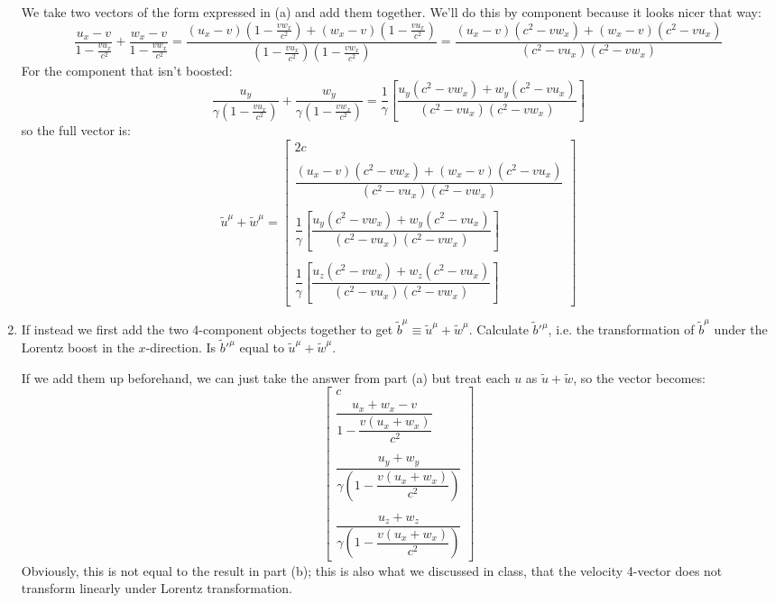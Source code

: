 \documentclass[10pt]{article}
\begin{document}
\begin{enumerate}[label=(\alph*)]
			\begin{solution}
				We take two vectors of the form expressed in (a) and add them together. We'll do this by
				component because it looks nicer that way:
				\[
					\frac{u_x - v}{1 - \frac{v u_x}{c^2}} + \frac{w_x - v}{1 - \frac{v w_x}{c^2}} =
					\frac{(u_x - v) \left( 1 - \frac{v w_x}{c^2} \right) + (w_x - v) \left( 1 - \frac{v
					u_x}{c^2} \right)}{\left( 1 - \frac{v u_x}{c^2} \right)\left( 1 - \frac{v w_x}{c^2}
			\right)} = \frac{(u_x - v)(c^2 - v w_x) + (w_x - v)(c^2 - v u_x)}{(c^2 - v u_x)(c^2 - vw_x)}
				\]
				For the component that isn't boosted:
				\[
					\frac{u_y}{\gamma\left( 1 - \frac{v u_x}{c^2} \right)} + \frac{w_y}{\gamma\left( 1 -
					\frac{v w_x}{c^2} \right)} = \frac{1}{\gamma}\left[ \frac{u_y(c^2 - vw_x) + w_y (c^2 -
			vu_x)}{(c^2 - vu_x)(c^2 - vw_x)}\right]
				\]
				so the full vector is:
				\[
					\tilde u^{\mu} + \tilde w^{\mu} = \begin{bmatrix} 2c\\ 
						\\
					\dfrac{(u_x - v)(c^2 - v w_x) + (w_x - v)(c^2 - v u_x)}{(c^2 - v u_x)(c^2 - vw_x)}\\
					\\
					\dfrac{1}{\gamma}\left[ \dfrac{u_y(c^2 - vw_x) + w_y (c^2 -
					vu_x)}{(c^2 - vu_x)(c^2 - vw_x)}\right]\\
					\\
					\dfrac{1}{\gamma}\left[ \dfrac{u_z(c^2 - vw_x) + w_z (c^2 -
					vu_x)}{(c^2 - vu_x)(c^2 - vw_x)}\right]
					\end{bmatrix}
				\]
			\end{solution}
		\item If instead we first add the two 4-component objects together to get \( \tilde b^{\mu} \equiv
			\tilde u ^{\mu} + \tilde w^{\mu} \). Calculate \( \tilde b'^{\mu} \), i.e. the transformation of
			\( \tilde b^{\mu} \) under the Lorentz boost in the \( x \)-direction. Is \( \tilde b'^{\mu} \)
			equal to \( \tilde u^{\mu} + \tilde w^{\mu} \). 

			\begin{solution}
				If we add them up beforehand, we can just take the answer from part (a) but treat each \( u
				\) as \( \tilde u + \tilde w \), so the vector becomes:
				\[
				\begin{bmatrix} c \\ \dfrac{u_x + w_x - v}{1 - \dfrac{v (u_x + w_x)}{c^2}} \\
					\\
					\dfrac{u_y + w_y}{\gamma\left( 1 - \dfrac{v (u_x + w_x)}{c^2} \right)}\\ 
					\\
					\dfrac{u_z + w_z}{\gamma\left( 1 - \dfrac{v (u_x + w_x)}{c^2} \right)}\end{bmatrix}
				\]
				Obviously, this is not equal to the result in part (b); this is also what we discussed in
				class, that the velocity 4-vector does not transform linearly under Lorentz transformation. 
			\end{solution}
	\end{enumerate}
\end{document}
